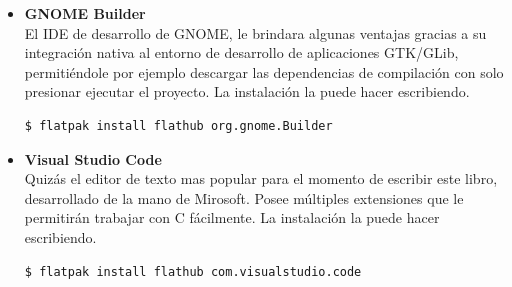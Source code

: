 \begin{itemize}
    \item \textbf{GNOME Builder}\\
    El IDE de desarrollo de GNOME, le brindara algunas ventajas gracias a su integración nativa al entorno de desarrollo de aplicaciones GTK/GLib, permitiéndole por ejemplo descargar las dependencias de compilación con solo presionar ejecutar el proyecto. La instalación la puede hacer escribiendo.
\begin{lstlisting}[language=bash]
$ flatpak install flathub org.gnome.Builder
\end{lstlisting}

    \item \textbf{Visual Studio Code}\\
    Quizás el editor de texto mas popular para el momento de escribir este libro, desarrollado de la mano de Mirosoft. Posee múltiples extensiones que le permitirán trabajar con C fácilmente. La instalación la puede hacer escribiendo.
\begin{lstlisting}[language=bash]
$ flatpak install flathub com.visualstudio.code
\end{lstlisting}
\end{itemize}
